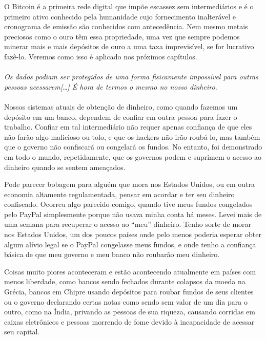 O Bitcoin é a primeira rede digital que impõe escassez sem intermediários e é o primeiro ativo conhecido pela humanidade cujo fornecimento inalterável e cronograma de emissão são conhecidos com antecedência. Nem mesmo metais preciosos como o ouro têm essa propriedade, uma vez que sempre podemos minerar mais e mais depósitos de ouro a uma taxa imprevisível, se for lucrativo fazê-lo. Veremos como isso é aplicado nos próximos capítulos.
\paragraph{}
\textit{Os dados podiam ser protegidos de uma forma fisicamente impossível para outras pessoas acessarem[\ldots] É hora de termos o mesmo no nosso dinheiro.}
\paragraph{}
Nossos sistemas atuais de obtenção de dinheiro, como quando fazemos um depósito em um banco, dependem de confiar em outra pessoa para fazer o trabalho. Confiar em tal intermediário não requer apenas confiança de que eles não farão algo malicioso ou tolo, e que os hackers não irão roubá-lo, mas também que o governo não confiscará ou congelará os fundos. No entanto, foi demonstrado em todo o mundo, repetidamente, que os governos podem e suprimem o acesso ao dinheiro quando se sentem ameaçados.

Pode parecer bobagem para alguém que mora nos Estados Unidos, ou em outra economia altamente regulamentada, pensar em acordar e ter seu dinheiro confiscado. Ocorreu algo parecido comigo, quando tive meus fundos congelados pelo PayPal simplesmente porque não usava minha conta há meses. Levei mais de uma semana para recuperar o acesso ao “meu” dinheiro. Tenho sorte de morar nos Estados Unidos, um dos poucos países onde pelo menos poderia esperar obter algum alívio legal se o PayPal congelasse meus fundos, e onde tenho a confiança básica de que meu governo e meu banco não roubarão meu dinheiro.

Coisas muito piores aconteceram e estão acontecendo atualmente em países com menos liberdade, como bancos sendo fechados durante colapsos da moeda na Grécia, bancos em Chipre usando depósitos para roubar fundos de seus clientes ou o governo declarando certas notas como sendo sem valor de um dia para o outro, como na Índia, privando as pessoas de sua riqueza, causando corridas em caixas eletrônicos e pessoas morrendo de fome devido à incapacidade de acessar seu capital.

